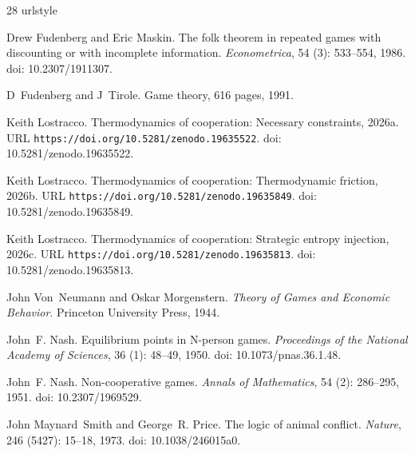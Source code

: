 \documentclass[11pt]{article}
\theoremstyle{plain}
\theoremstyle{definition}
\theoremstyle{remark}
\begin{document}
\begin{thebibliography}{28}
\providecommand{\natexlab}[1]{#1}
\providecommand{\url}[1]{\texttt{#1}}
\expandafter\ifx\csname urlstyle\endcsname\relax
  \providecommand{\doi}[1]{doi: #1}\else
  \providecommand{\doi}{doi: \begingroup \urlstyle{rm}\Url}\fi

Drew Fudenberg and Eric Maskin.
\newblock The folk theorem in repeated games with discounting or with
  incomplete information.
\newblock \emph{Econometrica}, 54 (3): 533--554, 1986.
\newblock \doi{10.2307/1911307}.

D~Fudenberg and J~Tirole.
\newblock Game theory, 616 pages, 1991.

\bibitem[Lostracco(2026{\natexlab{a}})]{TC-I}
Keith Lostracco.
\newblock Thermodynamics of cooperation: Necessary constraints,
  2026{\natexlab{a}}.
\newblock URL \url{https://doi.org/10.5281/zenodo.19635522}.
\newblock \doi{10.5281/zenodo.19635522}.

\bibitem[Lostracco(2026{\natexlab{b}})]{TC-IV}
Keith Lostracco.
\newblock Thermodynamics of cooperation: Thermodynamic friction,
  2026{\natexlab{b}}.
\newblock URL \url{https://doi.org/10.5281/zenodo.19635849}.
\newblock \doi{10.5281/zenodo.19635849}.

\bibitem[Lostracco(2026{\natexlab{c}})]{TC-II}
Keith Lostracco.
\newblock Thermodynamics of cooperation: Strategic entropy injection,
  2026{\natexlab{c}}.
\newblock URL \url{https://doi.org/10.5281/zenodo.19635813}.
\newblock \doi{10.5281/zenodo.19635813}.

John Von~Neumann and Oskar Morgenstern.
\newblock \emph{Theory of Games and Economic Behavior}.
\newblock Princeton University Press, 1944.

John~F. Nash.
\newblock Equilibrium points in {N}-person games.
\newblock \emph{Proceedings of the National Academy of Sciences}, 36
  (1): 48--49, 1950.
\newblock \doi{10.1073/pnas.36.1.48}.

John~F. Nash.
\newblock Non-cooperative games.
\newblock \emph{Annals of Mathematics}, 54 (2): 286--295,
  1951.
\newblock \doi{10.2307/1969529}.

John Maynard~Smith and George~R. Price.
\newblock The logic of animal conflict.
\newblock \emph{Nature}, 246 (5427): 15--18, 1973.
\newblock \doi{10.1038/246015a0}.


\end{thebibliography}
\end{document}
